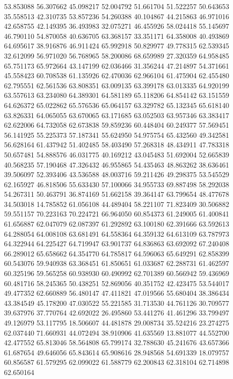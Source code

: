 53.853088
56.307662
45.098217
52.004792
51.661704
51.522257
50.643653
35.558513
42.310735
53.857236
54.260388
40.104867
44.215863
46.971016
42.658755
42.149395
36.493983
32.075271
46.455926
58.024418
55.145697
46.790110
54.870058
40.636705
63.368157
33.351171
64.358008
40.493869
64.695617
38.916876
46.911424
65.992918
50.829977
49.778315
62.539345
32.612099
56.971020
56.768965
58.200086
68.659989
27.320359
64.958485
65.751173
65.972664
43.147199
62.036466
31.356244
47.214897
54.371661
45.558423
60.708538
61.135926
62.470036
62.966104
61.475904
62.455480
62.795551
62.561536
63.808351
63.009135
63.399178
63.013335
64.920199
63.557613
63.234080
64.389301
64.581189
65.118206
64.854142
63.151559
64.626372
65.022862
65.576536
65.064157
63.329782
65.132345
65.618140
63.826331
64.065055
63.670065
63.171685
63.052503
63.957346
63.383417
62.622006
64.732058
62.673838
59.859236
60.448404
60.249377
57.569451
56.141925
55.225373
57.187341
55.624950
54.975754
65.432560
49.342581
56.628164
61.437942
51.402485
58.403490
57.268318
48.434911
47.783318
50.657481
54.888576
46.031775
40.169212
43.045483
51.692004
52.665839
40.568235
57.190468
47.326432
46.955865
54.435463
48.863262
38.636461
39.506097
52.393406
43.536588
48.003716
59.211426
49.298375
53.545529
62.165927
46.818506
55.633430
57.100066
34.955733
69.887498
58.292038
54.267311
50.463791
36.874169
51.662158
39.364147
63.799654
48.477678
34.503018
14.785852
61.056108
44.489404
58.221107
71.823409
30.506882
59.551157
70.223163
70.224721
66.964050
60.854373
61.249005
61.400841
61.656887
62.047079
62.087397
61.292892
63.100180
62.391666
63.592613
64.288054
64.008108
63.681491
64.558364
64.359132
64.613109
63.787973
64.322944
64.225427
64.719947
63.901737
64.836863
63.692092
67.240408
66.289012
65.658662
64.354770
64.785817
64.596063
65.649291
62.858399
60.543076
59.940938
63.368451
61.850651
61.033687
62.288731
61.462597
60.325196
59.565258
60.938930
60.490992
62.701389
60.566942
59.436969
60.481716
58.245365
50.438251
52.869056
40.351752
42.423475
53.544017
49.477352
62.660889
56.480147
47.411821
47.019566
55.680404
38.386434
43.384549
45.178200
47.030522
55.221585
31.713530
44.761126
30.709577
39.637976
37.770764
42.692022
26.495860
53.441276
41.461296
33.799497
49.126979
53.117795
18.506607
44.481878
29.008734
35.524216
23.274275
62.037440
71.660931
44.072494
38.910906
41.635569
13.881077
44.552700
42.477552
65.813046
58.564808
65.799174
32.788630
45.241676
43.657366
61.687654
49.646056
65.843614
65.908616
28.948568
54.691339
18.079757
60.856587
61.579295
62.099022
61.588779
62.200843
62.318104
62.714898
62.650164
